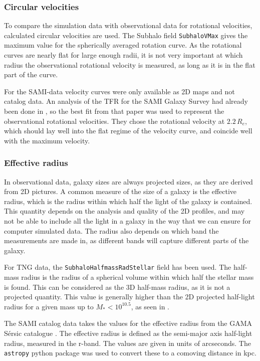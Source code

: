 \subsubsection{Circular velocities}
To compare the simulation data with observational data for rotational velocities, calculated circular velocities are used. The Subhalo field \texttt{SubhaloVMax} gives the maximum value for the spherically averaged rotation curve. As the rotational curves are nearly flat for large enough radii, it is not very important at which radius the observational rotational velocity is measured, as long as it is in the flat part of the curve. 

For the SAMI-data velocity curves were only available as 2D maps and not catalog data. An analysis of the TFR for the SAMI Galaxy Survey had already been done in \parencite{Bloom2017}, so the best fit from that paper was used to represent the observational rotational velocities. They chose the rotational velocity at $2.2\, R_e$, which should lay well into the flat regime of the velocity curve, and coincide well with the maximum velocity.


\subsubsection{Effective radius}
In observational data, galaxy sizes are always projected sizes, as they are derived from 2D pictures. A common measure of the size of a galaxy is the effective radius, which is the radius within which half the light of the galaxy is contained. This quantity depends on the analysis and quality of the 2D profiles, and may not be able to include all the light in a galaxy in the way that we can ensure for computer simulated data. The radius also depends on which band the measurements are made in, as different bands will capture different parts of the galaxy.

For TNG data, the \texttt{SubhaloHalfmassRadStellar} field has been used. The half-mass radius is the radius of a spherical volume within which half the stellar mass is found. This can be considered as the 3D half-mass radius, as it is not a projected quantity. This value is generally higher than the 2D projected half-light radius for a given mass up to $M_{*} < 10^10.5$, as seen in \parencite{Genel2017}.

The SAMI catalog data takes the values for the effective radius from the GAMA Sérsic catalogue \parencite{Kelvin2012}. The effective radius is defined as the semi-major axis half-light radius, measured in the r-band. The values are given in units of arcseconds. The \texttt{astropy} python package was used to convert these to a comoving distance in kpc.


